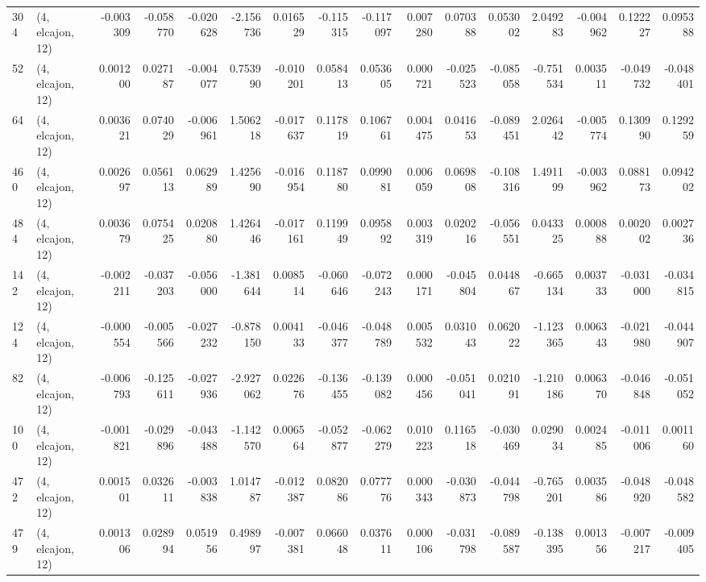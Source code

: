 \begin{tabular}{llrrrrrrrrrrrrrr}
304 &  (4, elcajon, 12) &  -0.003309 & -0.058770 & -0.020628 &   -2.156736 &  0.016529 &  -0.115315 & -0.117097 &  0.007280 &  0.070388 &  0.053002 &    2.049283 & -0.004962 &  0.122227 &  0.095388 \\
52  &  (4, elcajon, 12) &   0.001200 &  0.027187 & -0.004077 &    0.753990 & -0.010201 &   0.058413 &  0.053605 &  0.000721 & -0.025523 & -0.085058 &   -0.751534 &  0.003511 & -0.049732 & -0.048401 \\
64  &  (4, elcajon, 12) &   0.003621 &  0.074029 & -0.006961 &    1.506218 & -0.017637 &   0.117819 &  0.106761 &  0.004475 &  0.041653 & -0.089451 &    2.026442 & -0.005774 &  0.130990 &  0.129259 \\
460 &  (4, elcajon, 12) &   0.002697 &  0.056113 &  0.062989 &    1.425690 & -0.016954 &   0.118780 &  0.099081 &  0.006059 &  0.069808 & -0.108316 &    1.491199 & -0.003962 &  0.088173 &  0.094202 \\
484 &  (4, elcajon, 12) &   0.003679 &  0.075425 &  0.020880 &    1.426446 & -0.017161 &   0.119949 &  0.095892 &  0.003319 &  0.020216 & -0.056551 &    0.043325 &  0.000888 &  0.002002 &  0.002736 \\
142 &  (4, elcajon, 12) &  -0.002211 & -0.037203 & -0.056000 &   -1.381644 &  0.008514 &  -0.060646 & -0.072243 &  0.000171 & -0.045804 &  0.044867 &   -0.665134 &  0.003733 & -0.031000 & -0.034815 \\
124 &  (4, elcajon, 12) &  -0.000554 & -0.005566 & -0.027232 &   -0.878150 &  0.004133 &  -0.046377 & -0.048789 &  0.005532 &  0.031043 &  0.062022 &   -1.123365 &  0.006343 & -0.021980 & -0.044907 \\
82  &  (4, elcajon, 12) &  -0.006793 & -0.125611 & -0.027936 &   -2.927062 &  0.022676 &  -0.136455 & -0.139082 &  0.000456 & -0.051041 &  0.021091 &   -1.210186 &  0.006370 & -0.046848 & -0.051052 \\
100 &  (4, elcajon, 12) &  -0.001821 & -0.029896 & -0.043488 &   -1.142570 &  0.006564 &  -0.052877 & -0.062279 &  0.010223 &  0.116518 & -0.030469 &    0.029034 &  0.002485 & -0.011006 &  0.001160 \\
472 &  (4, elcajon, 12) &   0.001501 &  0.032611 & -0.003838 &    1.014787 & -0.012387 &   0.082086 &  0.077776 &  0.000343 & -0.030873 & -0.044798 &   -0.765201 &  0.003586 & -0.048920 & -0.048582 \\
479 &  (4, elcajon, 12) &   0.001306 &  0.028994 &  0.051956 &    0.498997 & -0.007381 &   0.066048 &  0.037611 &  0.000106 & -0.031798 & -0.089587 &   -0.138395 &  0.001356 & -0.007217 & -0.009405 \\

\end{tabular}
